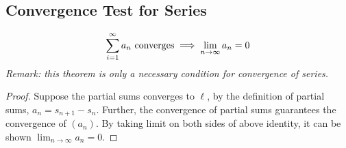 \documentclass[11pt]{article}
\begin{document}
	\subsection{Convergence Test for Series}
	\begin{theorem}
		\begin{align}
			\sum_{i=1}^\infty a_n \text{{ converges}} \implies \lim_{n \to \infty} a_n = 0
		\end{align}
		\emph{Remark: this theorem is only a necessary condition for convergence of series.}
	\end{theorem}
	
	\begin{proof}
		Suppose the partial sums converges to $\ell$, by the definition of partial sums, $a_n = s_{n+1} - s_{n}$. Further, the convergence of partial sums guarantees the convergence of $(a_n)$. By taking limit on both sides of above identity, it can be shown $\lim_{n \to \infty} a_n = 0$.
	\end{proof}
	
\end{document}

